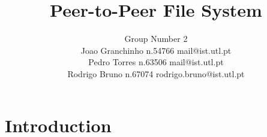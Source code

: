 \documentclass[times,9pt,article]{llncs}
\begin{document}
\title{Peer-to-Peer File System}
\author{Group Number 2 \\
Joao Granchinho n.54766 mail@ist.utl.pt \\
Pedro Torres  n.63506 mail@ist.utl.pt \\
Rodrigo Bruno n.67074 rodrigo.bruno@ist.utl.pt}
\maketitle


\section{Introduction}
\end{document}
